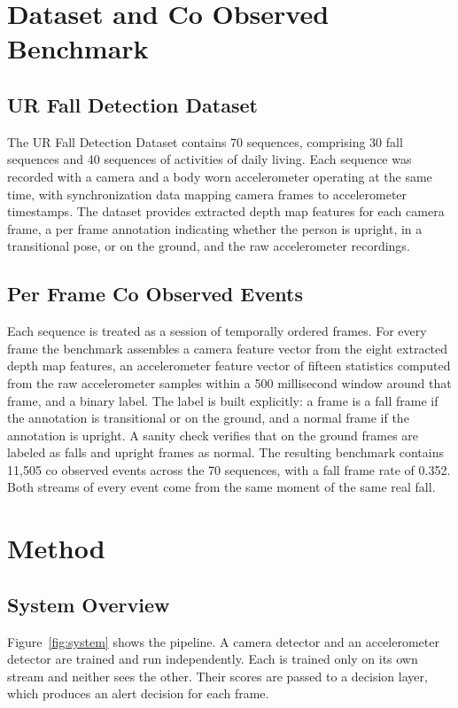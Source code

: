 \documentclass[conference]{IEEEtran}
\begin{document}
\section{Dataset and Co Observed Benchmark}
\subsection{UR Fall Detection Dataset}
The UR Fall Detection Dataset contains 70 sequences, comprising 30 fall
sequences and 40 sequences of activities of daily living. Each sequence was
recorded with a camera and a body worn accelerometer operating at the same time,
with synchronization data mapping camera frames to accelerometer timestamps. The
dataset provides extracted depth map features for each camera frame, a per frame
annotation indicating whether the person is upright, in a transitional pose, or
on the ground, and the raw accelerometer recordings.

\subsection{Per Frame Co Observed Events}
Each sequence is treated as a session of temporally ordered frames. For every
frame the benchmark assembles a camera feature vector from the eight extracted
depth map features, an accelerometer feature vector of fifteen statistics
computed from the raw accelerometer samples within a 500 millisecond window
around that frame, and a binary label. The label is built explicitly: a frame is
a fall frame if the annotation is transitional or on the ground, and a normal
frame if the annotation is upright. A sanity check verifies that on the ground
frames are labeled as falls and upright frames as normal. The resulting benchmark
contains 11{,}505 co observed events across the 70 sequences, with a fall frame
rate of 0.352. Both streams of every event come from the same moment of the same
real fall.

\section{Method}
\subsection{System Overview}
Figure~\ref{fig:system} shows the pipeline. A camera detector and an
accelerometer detector are trained and run independently. Each is trained only
on its own stream and neither sees the other. Their scores are passed to a
decision layer, which produces an alert decision for each frame.
\end{document}
